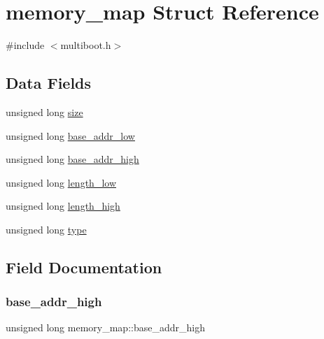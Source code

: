 \hypertarget{structmemory__map}{}\section{memory\+\_\+map Struct Reference}
\label{structmemory__map}


{\ttfamily \#include $<$multiboot.\+h$>$}

\subsection*{Data Fields}
\begin{DoxyCompactItemize}
\item 
unsigned long \hyperlink{structmemory__map_a7cc9c671b3fce55df7da566cee83c788}{size}
\item 
unsigned long \hyperlink{structmemory__map_a81d0a5c81c584b1dfefb29eb565ced21}{base\+\_\+addr\+\_\+low}
\item 
unsigned long \hyperlink{structmemory__map_ac2c50595b63c7c6d9e09a26d8ff82a80}{base\+\_\+addr\+\_\+high}
\item 
unsigned long \hyperlink{structmemory__map_a8498847818d49c539c0d2c9c8abedc90}{length\+\_\+low}
\item 
unsigned long \hyperlink{structmemory__map_acda914c5b912796f320848c0ba36eed3}{length\+\_\+high}
\item 
unsigned long \hyperlink{structmemory__map_aa133383a0820f52669530f483d2a8d14}{type}
\end{DoxyCompactItemize}


\subsection{Field Documentation}
\mbox{\label{structmemory__map_ac2c50595b63c7c6d9e09a26d8ff82a80}} 
\subsubsection{\texorpdfstring{base\+\_\+addr\+\_\+high}{base\_addr\_high}}
{\footnotesize\ttfamily unsigned long memory\+\_\+map\+::base\+\_\+addr\+\_\+high}

\mbox{\label{structmemory__map_a81d0a5c81c584b1dfefb29eb565ced21}} 
